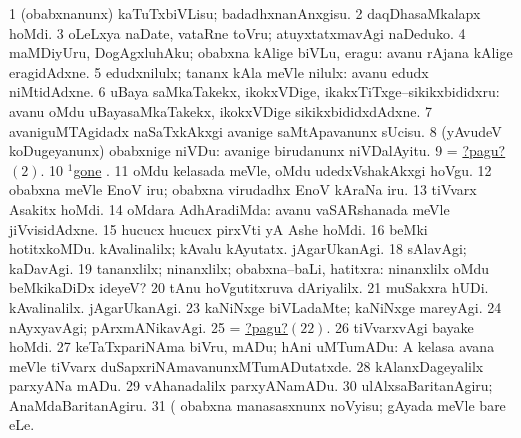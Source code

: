 \noindent
\gl{\pagu}
\bmng
\bnum
\num{1}  (obabxnanunx) kaTuTxbiVLisu; badadhxnanAnxgisu. 
\hypertarget{on1pagu2}{} 
\num{2}  daqDhasaMkalapx hoMdi. 
\num{3}  oLeLxya naDate, vataRne toVru; atuyxtatxmavAgi naDeduko. 
\num{4}  maMDiyUru, DogAgxluhAku; obabxna kAlige biVLu, eragu:  avanu rAjana kAlige eragidAdxne. 
\num{5}  edudxnilulx; tananx kAla meVle nilulx:  avanu edudx niMtidAdxne. 
\num{6}  uBaya saMkaTakekx, ikokxVDige, ikakxTiTxge--sikikxbididxru:  avanu oMdu uBayasaMkaTakekx, ikokxVDige sikikxbididxdAdxne. 
\num{7}  avaniguMTAgidadx naSaTxkAkxgi avanige saMtApavanunx sUcisu. 
\num{8}  (yAvudeV koDugeyanunx) obabxnige niVDu:  avanige birudanunx niVDalAyitu. 
\num{9}  = \hyperlink{on1pagu2}{?pagu?\((2)\)}. 
\num{10} \hyperref{kandict_g.pdf}{G}{gone(1) pagu(6)}{$^1$gone} . 
\num{11}  oMdu kelasada meVle, oMdu udedxVshakAkxgi hoVgu. 
\num{12}  obabxna meVle EnoV iru; obabxna virudadhx EnoV kAraNa iru. 
\num{13}  tiVvarx Asakitx hoMdi. 
\num{14}  oMdara AdhAradiMda:  avanu vaSARshanada meVle jiVvisidAdxne. 
\num{15}  hucucx hucucx pirxVti yA Ashe hoMdi. 
\num{16}  beMki hotitxkoMDu. 
  
\banum
{} kAvalinalilx; kAvalu kAyutatx. 
 jAgarUkanAgi. 
\eanum
\numie
\num{18}  sAlavAgi; kaDavAgi. 
\num{19}  tananxlilx; ninanxlilx; obabxna--baLi, hatitxra:  ninanxlilx oMdu beMkikaDiDx ideyeV? 
\num{20}  tAnu hoVgutitxruva dAriyalilx. 
\num{21}  muSakxra hUDi. 
\hypertarget{on1pagu22}{} 
  
\banum
{} kAvalinalilx. 
 jAgarUkanAgi. 
\eanum
\numie
\num{23}  kaNiNxge biVLadaMte; kaNiNxge mareyAgi. 
\num{24}  nAyxyavAgi; pArxmANikavAgi. 
\num{25}  = \hyperlink{on1pagu22}{?pagu?\((22)\)}. 
\num{26}  tiVvarxvAgi bayake hoMdi. 
\num{27}  keTaTxpariNAma biVru, mADu; hAni uMTumADu:  A kelasa avana meVle tiVvarx duSapxriNAmavanunxMTumADutatxde. 
\num{28}  kAlanxDageyalilx parxyANa mADu. 
\num{29}  vAhanadalilx parxyANamADu. 
\num{30}  ulAlxsaBaritanAgiru; AnaMdaBaritanAgiru. 
\num{31}  (  obabxna manasasxnunx noVyisu; gAyada meVle bare eLe. 
\enum
\emng
\eentry

